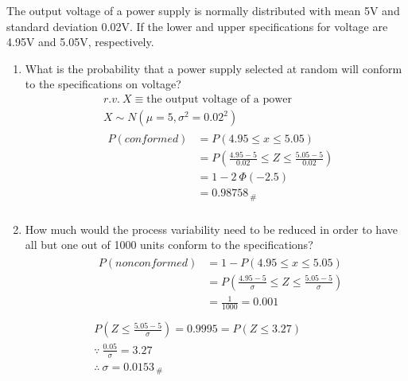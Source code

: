 The output voltage of a power supply is normally distributed with mean 5V and standard deviation 0.02V. If the lower and upper specifications for voltage are 4.95V and 5.05V, respectively.
\begin{enumerate}
    \item What is the probability that a power supply selected at random will conform to the specifications on voltage?
        \begin{align*}
            &r.v. \ X \equiv \text{the output voltage of a power}\\
            &X \sim N(\mu = 5, \sigma^2 = 0.02^2)\\
            &\begin{aligned}
                P(conformed) &= P\left(4.95 \leq x \leq 5.05\right)\\
                &= P\left(\frac{4.95 - 5}{0.02} \leq Z \leq \frac{5.05- 5}{0.02}\right)\\
                &= 1 - 2 \ \Phi(-2.5) \\
                &= 0.98758_{ \ \#}\\
            \end{aligned}
        \end{align*} 

    \item How much would the process variability need to be reduced in order to have all but one out of 1000 units conform to the specifications?
        \begin{align*}
            &\begin{aligned}
                P(nonconformed) &= 1- P\left(4.95 \leq x \leq 5.05\right)\\
                &= P\left(\frac{4.95 - 5}{\sigma} \leq Z \leq \frac{5.05- 5}{\sigma}\right)\\
                &= \frac{1}{1000} = 0.001\\
            \end{aligned}\\
            &P\left(Z \leq \frac{5.05 - 5}{\sigma}\right) = 0.9995 = P\left(Z \leq 3.27\right)\\
            &\because \ \frac{0.05}{\sigma} = 3.27\\
            &\therefore \ \sigma = 0.0153_{ \ \#}\\
        \end{align*}
        
    \end{enumerate}

    \pagebreak
